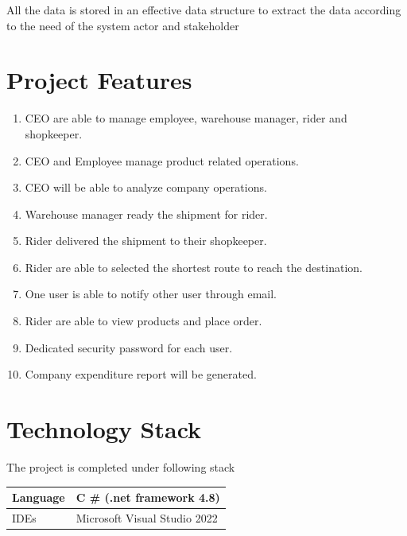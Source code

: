 \documentclass[12pt,a4paper]{report}
\begin{document}
All the data is stored in an effective data structure to extract the data according to the need of the system actor and stakeholder


\newpage
\chapter {Project Features}

\begin{enumerate}
\item CEO are able to manage employee, warehouse manager, rider and shopkeeper.  
\item CEO and Employee manage product related operations.
\item CEO will be able to analyze company operations.  
\item Warehouse manager ready the shipment for rider. 
\item Rider delivered the shipment to their shopkeeper. 
\item Rider are able to selected the shortest route to reach the destination.  
\item One user is able to notify other user through email.
\item Rider are able to view products and place order. 
\item Dedicated security password for each user. 
\item Company expenditure report will be generated.

\end{enumerate}

\newpage
\chapter {Technology Stack}
The project is completed under following stack \\ 
\begin{tabularx}{0.9\textwidth} { 
  | >{\raggedright\arraybackslash}X 
  | >{\centering\arraybackslash}X |
  }
  \hline
 Language & C \# (.net framework 4.8)   \\
 \hline
IDEs  & Microsoft Visual Studio 2022  \\
\hline
\end{tabularx}
\newpage
\end{document}
